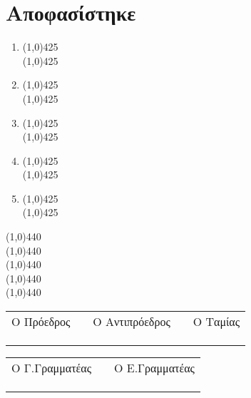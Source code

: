 \section{Αποφασίστηκε}
\vspace{1cm}
\begin{Large}
\begin{enumerate}
 \item \line(1,0){425} \\
 \line(1,0){425} \\
 \item \line(1,0){425} \\
 \line(1,0){425} \\
  \item \line(1,0){425} \\
 \line(1,0){425} \\
  \item \line(1,0){425} \\
 \line(1,0){425} \\
  \item \line(1,0){425} \\
 \line(1,0){425} \\

\end{enumerate}
\begin{center}
\line(1,0){440} \\
\line(1,0){440} \\
\line(1,0){440} \\
\line(1,0){440} \\
\line(1,0){440} \\
\end{center}
\end{Large}

\vspace{1cm}
\begin{center}
\begin{tabular}{>{\centering\arraybackslash}p{4.5cm} c >{\centering\arraybackslash}p{4.5cm} c >{\centering\arraybackslash}p{4.5cm}}
\centering
Ο Πρόεδρος && Ο Αντιπρόεδρος && Ο Ταμίας \\
&&&& \\
&&&& \\
\cline{1-1}  \cline{3-3}  \cline{5-5} \\
\end{tabular}
\end{center}

\vspace{0.5cm}

\begin{center}
\begin{tabular}{>{\centering\arraybackslash}p{4.5cm} c >{\centering\arraybackslash}p{4.5cm}}
\centering
Ο Γ.Γραμματέας && Ο Ε.Γραμματέας\\
&& \\
&& \\
\cline{1-1}  \cline{3-3}\\
\end{tabular}
\end{center}

\vspace{0.5cm}
\newpage